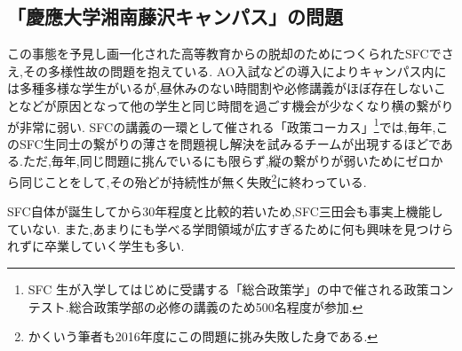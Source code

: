 \documentclass[uplatex, a4j]{jsarticle}
\begin{document}
%
%


\subsection{「慶應大学湘南藤沢キャンパス」の問題}
  この事態を予見し画一化された高等教育からの脱却のためにつくられたSFC\cite{kakuitsu}でさえ,その多様性故の問題を抱えている.
  AO入試などの導入によりキャンパス内には多種多様な学生がいるが,昼休みのない時間割や必修講義がほぼ存在しないことなどが原因となって他の学生と同じ時間を過ごす機会が少なくなり横の繋がりが非常に弱い.
  SFCの講義の一環として催される「政策コーカス」\footnote{SFC
  生が入学してはじめに受講する「総合政策学」の中で催される政策コンテスト.総合政策学部の必修の講義のため500名程度が参加.}では,毎年,このSFC生同士の繋がりの薄さを問題視し解決を試みるチームが出現するほどである.ただ,毎年,同じ問題に挑んでいるにも限らず,縦の繋がりが弱いためにゼロから同じことをして,その殆どが持続性が無く失敗\footnote{かくいう筆者も2016年度にこの問題に挑み失敗した身である.}に終わっている.

  SFC自体が誕生してから30年程度と比較的若いため,SFC三田会も事実上機能していない.\cite{diamond}
  また,あまりにも学べる学問領域が広すぎるために何も興味を見つけられずに卒業していく学生も多い.
\end{document}
